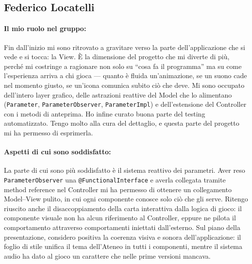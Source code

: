 \documentclass[11pt, a4paper, oneside]{report}
\begin{document}
\subsection{Federico Locatelli}

\paragraph{Il mio ruolo nel gruppo:}
Fin dall'inizio mi sono ritrovato a gravitare verso la parte
dell'applicazione che si vede e si tocca: la View. È la dimensione del
progetto che mi diverte di più, perché mi costringe a ragionare non solo
su ``cosa fa il programma'' ma su come l'esperienza arriva a chi gioca ---
quanto è fluida un'animazione, se un suono cade nel momento giusto, se
un'icona comunica subito ciò che deve. Mi sono occupato dell'intero layer
grafico, delle astrazioni reattive del Model che lo alimentano
(\texttt{Parameter}, \texttt{ParameterObserver}, \texttt{ParameterImpl})
e dell'estensione del Controller con i metodi di anteprima. Ho infine
curato buona parte del testing automatizzato. Tengo molto alla cura del
dettaglio, e questa parte del progetto mi ha permesso di esprimerla.

\paragraph{Aspetti di cui sono soddisfatto:}
La parte di cui sono più soddisfatto è il sistema reattivo dei parametri. Aver
reso \texttt{ParameterObserver} una \texttt{@FunctionalInterface} e averla
collegata tramite method reference nel Controller mi ha permesso di ottenere un
collegamento Model--View pulito, in cui ogni componente conosce solo ciò che gli
serve. Ritengo riuscito anche il disaccoppiamento della carta interattiva dalla
logica di gioco: il componente visuale non ha alcun riferimento al Controller,
eppure ne pilota il comportamento attraverso comportamenti iniettati
dall'esterno. Sul piano della presentazione, considero positiva la coerenza
visiva e sonora dell'applicazione: il foglio di stile unifica il tema
dell'Ateneo in tutti i componenti, mentre il sistema audio ha dato al gioco un
carattere che nelle prime versioni mancava.
\end{document}
